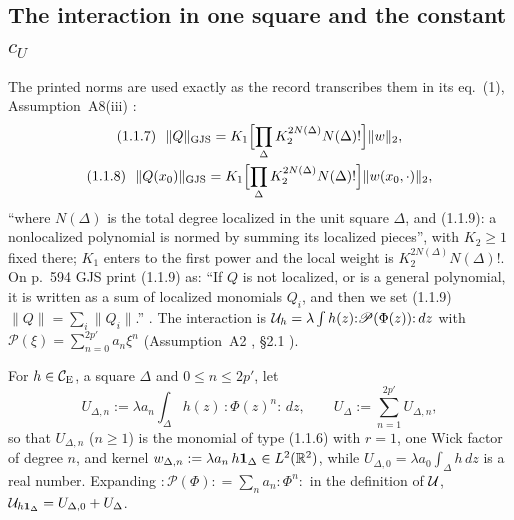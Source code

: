 \subsection{The interaction in one square and the constant $c_U$}\label{sec:notation-cU}

The printed norms are used exactly as the record transcribes them in its eq.~(1),
Assumption~A8(iii) \cite[p.~10]{R}:
\[
\begin{gathered}
 \text{(1.1.7)}\ \ \lVert Q\rVert_{\mathrm{GJS}}=K_1\Bigl[\prod_\Delta K_2^{2N(\Delta)}N(\Delta)!\Bigr]\|w\|_2,\\
 \text{(1.1.8)}\ \ \lVert Q(x_0)\rVert_{\mathrm{GJS}}=K_1\Bigl[\prod_\Delta K_2^{2N(\Delta)}N(\Delta)!\Bigr]\|w(x_0,\cdot)\|_2,
\end{gathered}
\]
``where $N(\Delta)$ is the total degree localized in the unit square $\Delta$, and (1.1.9): a
nonlocalized polynomial is normed by summing its localized pieces'', with $K_2\ge1$ fixed
there; $K_1$ enters to the first power and the local weight is $K_2^{2N(\Delta)}N(\Delta)!$.
On p.~594 GJS print (1.1.9) as: ``If $Q$ is not localized, or is a general polynomial, it is
written as a sum of localized monomials $Q_i$, and then we set (1.1.9) $\|Q\|=\sum_i\|Q_i\|$.''
\cite[p.~594]{GJS}.  The interaction is $\mathcal U_h=\lambda\int h(z){:}\mathscr P(\Phi(z)){:}\,dz$
with $\mathscr P(\xi)=\sum_{n=0}^{2p'}a_n\xi^n$ (Assumption~A2 \cite[p.~8]{R}, \S2.1
\cite[p.~6]{R}).

\begin{auxdef}\label{aux:notation-UDelta}
For $h\in\mathcal{C}_{\mathrm E}$, a square $\Delta$ and $0\le n\le2p'$, let
\[
 U_{\Delta,n}:=\lambda a_n\int_\Delta h(z)\,{:}\Phi(z)^n{:}\,dz ,\qquad
 U_\Delta:=\sum_{n=1}^{2p'}U_{\Delta,n} ,
\]
so that $U_{\Delta,n}$ ($n\ge1$) is the monomial of type (1.1.6) with $r=1$, one Wick factor
of degree $n$, and kernel $w_{\Delta,n}:=\lambda a_n\,h\mathbf 1_\Delta\in L^2(\mathbb{R}^2)$, while
$U_{\Delta,0}=\lambda a_0\int_\Delta h\,dz$ is a real number.  Expanding ${:}\mathscr
P(\Phi){:}=\sum_na_n{:}\Phi^n{:}$ in the definition of $\mathcal U$,
$\mathcal U_{h\mathbf 1_\Delta}=U_{\Delta,0}+U_\Delta$.
\end{auxdef}

